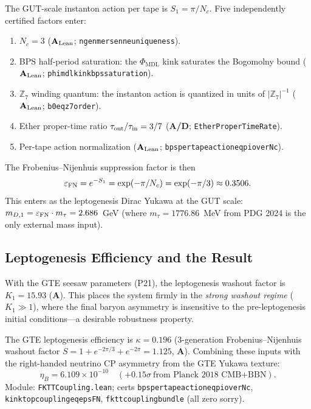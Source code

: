 \documentclass[11pt,openany]{book}
\theoremstyle{remark}
\newcommand{\PHIMDL}{\Phi_{\mathrm{MDL}}}
\newcommand{\ZS}{\mathbb{Z}_7}
\newcommand{\lean}[1]{%
  \penalty-100
  \begingroup\def\_{\textunderscore\allowbreak}\texttt{#1}\endgroup}
\newcommand{\Nc}{N_c}
\newcommand{\CatA}{\textbf{A}}
\newcommand{\CatAL}{\ensuremath{\textbf{A}_{\rm Lean}}}
\newcommand{\CatAD}{\textbf{A/D}}
\begin{document}
The GUT-scale instanton action per tape is $S_1 = \pi/\Nc$.
Five independently certified factors enter:
\begin{enumerate}
\item $\Nc = 3$ (\CatAL; \lean{ngen\_3\_mersenne\_uniqueness}).
\item BPS half-period saturation: the $\PHIMDL$ kink saturates the Bogomolny bound
  (\CatAL; \lean{phi\_mdl\_kink\_bps\_saturation}).
\item $\ZS$ winding quantum: the instanton action is quantized in units of $|\ZS|^{-1}$
  (\CatAL; \lean{b0\_eq\_z7\_order}).
\item Ether proper-time ratio $\tau_{\rm out}/\tau_{\rm in} = 3/7$
  (\CatAD; \lean{EtherProperTimeRate}).
\item Per-tape action normalization
  (\CatAL; \lean{bps\_per\_tape\_action\_eq\_pi\_over\_Nc}).
\end{enumerate}
The Frobenius--Nijenhuis suppression factor is then
\[
  \varepsilon_{\rm FN}
  = e^{-S_1}
  = \exp(-\pi/\Nc)
  = \exp(-\pi/3)
  \approx 0.3506.
\]
This enters as the leptogenesis Dirac Yukawa at the GUT scale:
$m_{D,1} = \varepsilon_{\rm FN} \cdot m_\tau = 2.686$~GeV
(where $m_\tau = 1776.86$~MeV from PDG 2024 is the only external mass input).

\subsection*{Leptogenesis Efficiency and the Result}

With the GTE seesaw parameters (P21), the leptogenesis washout factor is
$K_1 = 15.93$ (\CatA).
This places the system firmly in the \emph{strong washout regime} ($K_1 \gg 1$),
where the final baryon asymmetry is insensitive to the pre-leptogenesis initial
conditions---a desirable robustness property.

The GTE leptogenesis efficiency is $\kappa = 0.196$
(3-generation Frobenius--Nijenhuis washout factor $S = 1 + e^{-2\pi/3} + e^{-2\pi} = 1.125$,
\CatA).
Combining these inputs with the right-handed neutrino CP asymmetry from the GTE Yukawa
texture:
\begin{equation}
  \eta_B = 6.109 \times 10^{-10}
  \quad (+0.15\sigma\ \text{from Planck 2018 CMB+BBN}).
\label{eq:eta_b}
\end{equation}
Module: \lean{FKTTCoupling.lean}; certs \lean{bps\_per\_tape\_action\_eq\_pi\_over\_Nc},
\lean{kink\_top\_coupling\_eq\_eps\_FN}, \lean{fktt\_coupling\_bundle} (all zero sorry).
\end{document}
